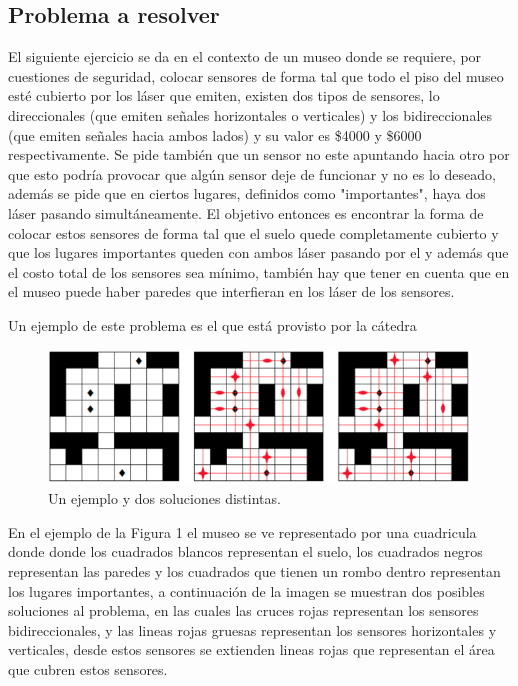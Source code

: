 \subsection{Problema a resolver}

El siguiente ejercicio se da en el contexto de un museo donde se requiere, por cuestiones de seguridad, colocar sensores de forma tal que todo el piso del museo esté cubierto por los láser que emiten, existen dos tipos de sensores, lo direccionales (que emiten señales horizontales o verticales) y los bidireccionales (que emiten señales hacia ambos lados) y su valor es \$4000 y \$6000 respectivamente. Se pide también que un sensor no este apuntando hacia otro por que esto podría provocar que algún sensor deje de funcionar y no es lo deseado, además se pide que en ciertos lugares, definidos como "importantes", haya dos láser pasando simultáneamente. El objetivo entonces es encontrar la forma de colocar estos sensores de forma tal que el suelo quede completamente cubierto y que los lugares importantes queden con ambos láser pasando por el y además que el costo total de los sensores sea mínimo, también hay que tener en cuenta que en el museo puede haber paredes que interfieran en los láser de los sensores.

Un ejemplo de este problema es el que está provisto por la cátedra


\begin{figure}[H]
	\begin{center}
		\includegraphics[width=320pt]{../imgs/ej3_ejemploCatedra.png}
	\end{center}
\caption{Un ejemplo y dos soluciones distintas.}
\end{figure}

En el ejemplo de la Figura 1 el museo se ve representado por una cuadricula donde donde los cuadrados blancos representan el suelo, los cuadrados negros representan las paredes y los cuadrados que tienen un rombo dentro representan los lugares importantes, a continuación de la imagen se muestran dos posibles soluciones al problema, en las cuales las cruces rojas representan los sensores bidireccionales, y las lineas rojas gruesas representan los sensores horizontales y verticales, desde estos sensores se extienden lineas rojas que representan el área que cubren estos sensores.

